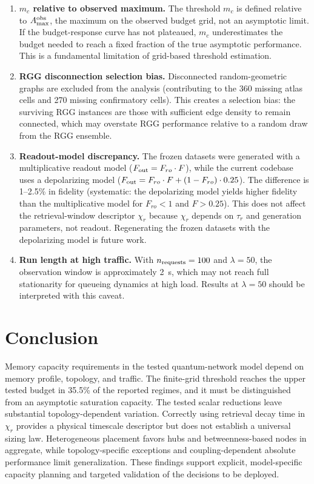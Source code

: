 \documentclass[quantumrep,article,submit,moreauthors]{Definitions/mdpi}
\begin{document}
\begin{enumerate}[leftmargin=2em]
\item \textbf{$m_c$ relative to observed maximum.} The threshold $m_c$ is defined relative to $A_{\max}^{\rm obs}$, the maximum on the observed budget grid, not an asymptotic limit. If the budget-response curve has not plateaued, $m_c$ underestimates the budget needed to reach a fixed fraction of the true asymptotic performance. This is a fundamental limitation of grid-based threshold estimation.

\item \textbf{RGG disconnection selection bias.} Disconnected random-geometric graphs are excluded from the analysis (contributing to the 360 missing atlas cells and 270 missing confirmatory cells). This creates a selection bias: the surviving RGG instances are those with sufficient edge density to remain connected, which may overstate RGG performance relative to a random draw from the RGG ensemble.

\item \textbf{Readout-model discrepancy.} The frozen datasets were generated with a multiplicative readout model ($F_{\rm out} = F_{ro} \cdot F$), while the current codebase uses a depolarizing model ($F_{\rm out} = F_{ro} \cdot F + (1-F_{ro}) \cdot 0.25$). The difference is 1--2.5\% in fidelity (systematic: the depolarizing model yields higher fidelity than the multiplicative model for $F_{ro} < 1$ and $F > 0.25$). This does not affect the retrieval-window descriptor $\chi_r$ because $\chi_r$ depends on $\tau_r$ and generation parameters, not readout. Regenerating the frozen datasets with the depolarizing model is future work.

\item \textbf{Run length at high traffic.} With $n_{\rm requests} = 100$ and $\lambda = 50$, the observation window is approximately 2~s, which may not reach full stationarity for queueing dynamics at high load. Results at $\lambda = 50$ should be interpreted with this caveat.
\end{enumerate}

\FloatBarrier

\section{Conclusion}

Memory capacity requirements in the tested quantum-network model depend on memory profile, topology, and traffic. The finite-grid threshold reaches the upper tested budget in 35.5\% of the reported regimes, and it must be distinguished from an asymptotic saturation capacity. The tested scalar reductions leave substantial topology-dependent variation. Correctly using retrieval decay time in $\chi_r$ provides a physical timescale descriptor but does not establish a universal sizing law. Heterogeneous placement favors hubs and betweenness-based nodes in aggregate, while topology-specific exceptions and coupling-dependent absolute performance limit generalization. These findings support explicit, model-specific capacity planning and targeted validation of the decisions to be deployed.
\end{document}
